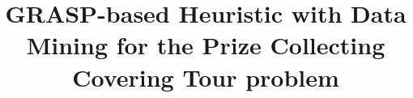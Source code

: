 \documentclass{singlecol-new}
\begin{document}

%





\BottomCatch

\CLline


\def\floatpagepagefraction{1}
\def\textpagefraction{.001}


\title{GRASP-based Heuristic with Data Mining for the Prize Collecting Covering Tour problem}                      

%















\end{document}
